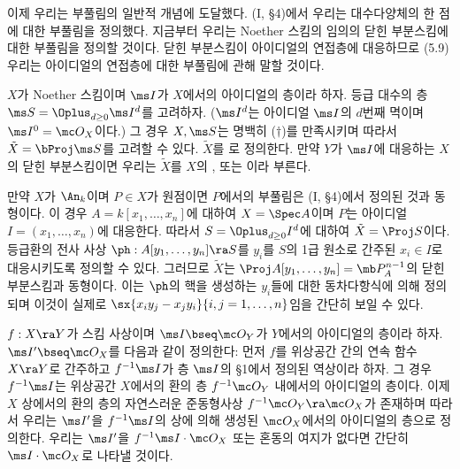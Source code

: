 	이제 우리는 부풀림의 일반적 개념에 도달했다. (I, \S 4)에서 우리는 대수다양체의 한 점에 대한 부풀림을 정의했다.
	지금부터 우리는 Noether 스킴의 임의의 닫힌 부분스킴에 대한 부풀림을 정의할 것이다.
	닫힌 부분스킴이 아이디얼의 연접층에 대응하므로 (5.9) 우리는 아이디얼의 연접층에 대한 부풀림에 관해 말할 것이다.
	
	
	\begin{definition}
	$X$가 Noether 스킴이며 $\ms I$가 $X$에서의 아이디얼의 층이라 하자. 등급 대수의 층 $\ms S=\Oplus_{d\ge 0}\ms I^d$를 고려하자.
	($\ms I^d$는 아이디얼 $\ms I$의 $d$번째 멱이며 $\ms I^0=\mc O_X$이다.)
	그 경우 $X,\ms S$는 명백히 ($\dag$)를 만족시키며 따라서 $\tilde X=\bProj\ms S$를 고려할 수 있다.
	$\tilde X$를 로 정의한다.
	만약 $Y$가 $\ms I$에 대응하는 $X$의 닫힌 부분스킴이면 우리는 $\tilde X$를
	$X$의 , 또는  이라 부른다.
	\end{definition}
	
	
	\begin{example}
	만약 $X$가 $\An_k$이며 $P\in X$가 원점이면 $P$에서의 부풀림은 (I, \S 4)에서 정의된 것과 동형이다.
	이 경우 $A=k[x_1,\ldots,x_n]$에 대하여 $X=\Spec A$이며 $P$는 아이디얼 $I=(x_1,\ldots,x_n)$에 대응한다.
	따라서 $S=\Oplus_{d\ge 0}I^d$에 대하여 $\tilde X=\Proj S$이다.
	등급환의 전사 사상 $\ph:A[y_1,\ldots,y_n]\ra S$를 $y_i$를 $S$의 1급 원소로 간주된 $x_i\in I$로 대응시키도록 정의할 수 있다.
	그러므로 $\tilde X$는 $\Proj A[y_1,\ldots,y_n]=\mb P^{n-1}_A$의 닫힌 부분스킴과 동형이다.
	이는 $\ph$의 핵을 생성하는 $y_i$들에 대한 동차다항식에 의해 정의되며
	이것이 실제로 $\sx{x_iy_j-x_jy_i}{i,j=1,\ldots,n}$임을 간단히 보일 수 있다.
	\end{example}
	
	
	\begin{definition}
	$f:X\ra Y$가 스킴 사상이며 $\ms I\bseq\mc O_Y$가 $Y$에서의 아이디얼의 층이라 하자.
	 $\ms I'\bseq\mc O_X$를 다음과 같이 정의한다:
	먼저 $f$를 위상공간 간의 연속 함수 $X\ra Y$로 간주하고 $f^{-1}\ms I$가 층 $\ms I$의 \S 1에서 정의된 역상이라 하자.
	그 경우 $f^{-1}\ms I$는 위상공간 $X$에서의 환의 층 $f^{-1}\mc O_Y$ 내에서의 아이디얼의 층이다.
	이제 $X$ 상에서의 환의 층의 자연스러운 준동형사상 $f^{-1}\mc O_Y\ra\mc O_X$가 존재하며
	따라서 우리는 $\ms I'$을 $f^{-1}\ms I$의 상에 의해 생성된 $\mc O_X$에서의 아이디얼의 층으로 정의한다.
	우리는 $\ms I'$을 $f^{-1}\ms I\cdot\mc O_X$ 또는 혼동의 여지가 없다면 간단히 $\ms I\cdot\mc O_X$로 나타낼 것이다.
	\end{definition}
	
